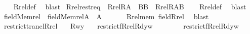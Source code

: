 \begin{isabellebody}
%
\isadelimproof
\ \ %
\endisadelimproof
%
\isatagproof
{}\isamarkupfalse%
\ Rrel{\isacharunderscore}{\kern0pt}def\ \isamarkupfalse%
\ blast%
\endisatagproof
{\isafoldproof}%
%
\isadelimproof
\isanewline
%
\endisadelimproof
\isanewline
{}\isamarkupfalse%
\ Rrel{\isacharunderscore}{\kern0pt}restr{\isacharunderscore}{\kern0pt}eq\ {\isacharcolon}{\kern0pt}\ {\isachardoublequoteopen}Rrel{\isacharparenleft}{\kern0pt}R{\isacharcomma}{\kern0pt}A{\isacharparenright}{\kern0pt}\ {\isasyminter}\ B{\isasymtimes}B\ {\isacharequal}{\kern0pt}\ Rrel{\isacharparenleft}{\kern0pt}R{\isacharcomma}{\kern0pt}A{\isasyminter}B{\isacharparenright}{\kern0pt}{\isachardoublequoteclose}\isanewline
%
\isadelimproof
\ \ %
\endisadelimproof
%
\isatagproof
{}\isamarkupfalse%
\ Rrel{\isacharunderscore}{\kern0pt}def\ \isamarkupfalse%
\ blast%
\endisatagproof
{\isafoldproof}%
%
\isadelimproof
\isanewline
%
\endisadelimproof
\isanewline
\isanewline
{}\isamarkupfalse%
\ field{\isacharunderscore}{\kern0pt}Memrel\ {\isacharcolon}{\kern0pt}\ {\isachardoublequoteopen}field{\isacharparenleft}{\kern0pt}Memrel{\isacharparenleft}{\kern0pt}A{\isacharparenright}{\kern0pt}{\isacharparenright}{\kern0pt}\ {\isasymsubseteq}\ A{\isachardoublequoteclose}\isanewline
\ \ \isanewline
%
\isadelimproof
\ \ %
\endisadelimproof
%
\isatagproof
{}\isamarkupfalse%
\ Rrel{\isacharunderscore}{\kern0pt}mem\ field{\isacharunderscore}{\kern0pt}Rrel\ \isamarkupfalse%
\ blast%
\endisatagproof
{\isafoldproof}%
%
\isadelimproof
\isanewline
%
\endisadelimproof
\isanewline
{}\isamarkupfalse%
\ restrict{\isacharunderscore}{\kern0pt}trancl{\isacharunderscore}{\kern0pt}Rrel{\isacharcolon}{\kern0pt}\isanewline
\ \ \ {\isachardoublequoteopen}R{\isacharparenleft}{\kern0pt}w{\isacharcomma}{\kern0pt}y{\isacharparenright}{\kern0pt}{\isachardoublequoteclose}\isanewline
\ \ \ {\isachardoublequoteopen}restrict{\isacharparenleft}{\kern0pt}f{\isacharcomma}{\kern0pt}Rrel{\isacharparenleft}{\kern0pt}R{\isacharcomma}{\kern0pt}d{\isacharparenright}{\kern0pt}{\isacharminus}{\kern0pt}{\isacharbackquote}{\kern0pt}{\isacharbackquote}{\kern0pt}{\isacharbraceleft}{\kern0pt}y{\isacharbraceright}{\kern0pt}{\isacharparenright}{\kern0pt}{\isacharbackquote}{\kern0pt}w\isanewline
\ \ \ \ \ \ \ {\isacharequal}{\kern0pt}\ restrict{\isacharparenleft}{\kern0pt}f{\isacharcomma}{\kern0pt}{\isacharparenleft}{\kern0pt}Rrel{\isacharparenleft}{\kern0pt}R{\isacharcomma}{\kern0pt}d{\isacharparenright}{\kern0pt}{\isacharcircum}{\kern0pt}{\isacharplus}{\kern0pt}{\isacharparenright}{\kern0pt}{\isacharminus}{\kern0pt}{\isacharbackquote}{\kern0pt}{\isacharbackquote}{\kern0pt}{\isacharbraceleft}{\kern0pt}y{\isacharbraceright}{\kern0pt}{\isacharparenright}{\kern0pt}{\isacharbackquote}{\kern0pt}w{\isachardoublequoteclose}\isanewline

\end{isabellebody}
